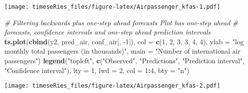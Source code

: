 \documentclass[]{book}
\newenvironment{Shaded}{\begin{snugshade}}{\end{snugshade}}
\newcommand{\CommentTok}[1]{\textcolor[rgb]{0.56,0.35,0.01}{\textit{#1}}}
\newcommand{\DataTypeTok}[1]{\textcolor[rgb]{0.13,0.29,0.53}{#1}}
\newcommand{\DecValTok}[1]{\textcolor[rgb]{0.00,0.00,0.81}{#1}}
\newcommand{\KeywordTok}[1]{\textcolor[rgb]{0.13,0.29,0.53}{\textbf{#1}}}
\newcommand{\NormalTok}[1]{#1}
\newcommand{\OperatorTok}[1]{\textcolor[rgb]{0.81,0.36,0.00}{\textbf{#1}}}
\newcommand{\StringTok}[1]{\textcolor[rgb]{0.31,0.60,0.02}{#1}}
\begin{document}
\texttt{[image: timeseRies\_files/figure-latex/Airpassenger\_kfas-1.pdf]}

\begin{Shaded}
\begin{Highlighting}[]
\CommentTok{# Filtering backwards plus one-step ahead forecasts Plot has one-step ahead}
\CommentTok{# forecasts, confidence intervals and one-step ahead prediction intervals}
\KeywordTok{ts.plot}\NormalTok{(}\KeywordTok{cbind}\NormalTok{(y2, pred_air, conf_air[, }\DecValTok{-1}\NormalTok{]), }\DataTypeTok{col =} \KeywordTok{c}\NormalTok{(}\DecValTok{1}\NormalTok{, }\DecValTok{2}\NormalTok{, }\DecValTok{3}\NormalTok{, }\DecValTok{3}\NormalTok{, }\DecValTok{4}\NormalTok{, }\DecValTok{4}\NormalTok{), }\DataTypeTok{ylab =} \StringTok{"log monthly total passengers (in thousands)"}\NormalTok{, }
    \DataTypeTok{main =} \StringTok{"Number of international air passengers"}\NormalTok{)}
\KeywordTok{legend}\NormalTok{(}\StringTok{"topleft"}\NormalTok{, }\KeywordTok{c}\NormalTok{(}\StringTok{"Observed"}\NormalTok{, }\StringTok{"Predictions"}\NormalTok{, }\StringTok{"Prediction interval"}\NormalTok{, }\StringTok{"Confidence interval"}\NormalTok{), }
    \DataTypeTok{lty =} \DecValTok{1}\NormalTok{, }\DataTypeTok{lwd =} \DecValTok{2}\NormalTok{, }\DataTypeTok{col =} \DecValTok{1}\OperatorTok{:}\DecValTok{4}\NormalTok{, }\DataTypeTok{bty =} \StringTok{"n"}\NormalTok{)}
\end{Highlighting}
\end{Shaded}

\texttt{[image: timeseRies\_files/figure-latex/Airpassenger\_kfas-2.pdf]}
\end{document}
